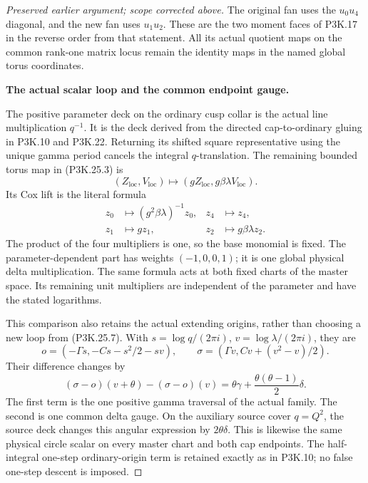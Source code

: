 \begin{proof}[Preserved earlier argument; scope corrected above]
The original fan uses the \(u_0u_4\) diagonal, and the new fan
uses \(u_1u_2\). These are the two moment faces of P3K.17 in
the reverse order from that statement. All its actual quotient
maps on the common rank-one matrix locus remain the identity
maps in the named global torus coordinates.

\par\medskip\noindent\textbf{The actual scalar loop and the common endpoint gauge.}\enspace

The positive parameter deck on the ordinary cusp collar is
the actual line multiplication \(q^{-1}\). It is the deck
derived from the directed cap-to-ordinary gluing in P3K.10
and P3K.22. Returning its shifted square representative using
the unique gamma period cancels the integral \(q\)-translation.
The remaining bounded torus map in (P3K.25.3) is
\[
       (Z_{\mathrm{loc}},V_{\mathrm{loc}})
           \longmapsto(gZ_{\mathrm{loc}},
                             g\beta\lambda V_{\mathrm{loc}}).
                                                        \tag{P3K.25.6}
\]
Its Cox lift is the literal formula
\[
\begin{aligned}
 z_0&\longmapsto(g^2\beta\lambda)^{-1}z_0,
 & z_4&\longmapsto z_4,\\
 z_1&\longmapsto gz_1,
 & z_2&\longmapsto g\beta\lambda z_2 .
\end{aligned}                                          \tag{P3K.25.7}
\]
The product of the four multipliers is one, so the base
monomial is fixed. The parameter-dependent part has weights
\((-1,0,0,1)\); it is one global physical delta multiplication.
The same formula acts at both fixed charts of the master
space. Its remaining unit multipliers are independent of the
parameter and have the stated logarithms.

This comparison also retains the actual extending origins,
rather than choosing a new loop from (P3K.25.7).
With \(s=\log q/(2\pi i)\), \(v=\log\lambda/(2\pi i)\),
they are
\[
 o=(-\Gamma s,-Cs-s^2/2-sv),\qquad
 \sigma=(\Gamma v,Cv+(v^2-v)/2).
\]
Their difference changes by
\[
 (\sigma-o)(v+\theta)-(\sigma-o)(v)
     =\theta\gamma+\frac{\theta(\theta-1)}2\delta.
                                                        \tag{P3K.25.8}
\]
The first term is the one positive gamma traversal of the
actual family. The second is one common delta gauge. On the
auxiliary source cover \(q=Q^2\), the source deck changes this
angular expression by \(2\theta\delta\). This is likewise the
same physical circle scalar on every master chart and both
cap endpoints. The half-integral one-step ordinary-origin
term is retained exactly as in P3K.10; no false one-step
descent is imposed.


\end{proof}
